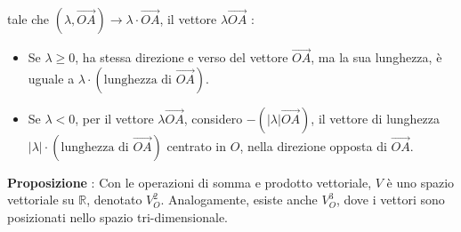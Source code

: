 \documentclass[12pt, letterpaper]{article}
\newcommand{\R}{{\mathbb R}}
\begin{document}
tale che \((\lambda,\vec{OA})\rightarrow \lambda\cdot\vec{OA}\), il vettore \(\lambda\vec{OA}\) : \begin{itemize}
    \item Se \(\lambda\ge 0\), ha stessa direzione e verso del vettore \(\vec{OA}\), ma la sua lunghezza, è uguale 
    a \(\lambda \cdot (\text{lunghezza di }\vec{OA})\).
    \item Se \(\lambda<0\), per il vettore \(\lambda\vec{OA}\), considero \(-(|\lambda|\vec{OA})\), il vettore 
    di lunghezza \(|\lambda| \cdot (\text{lunghezza di }\vec{OA})\) centrato in \(O\), nella direzione 
    opposta di \(\vec{OA}\).
\end{itemize}
\begin{figure}[h]
\end{figure}
\textbf{Proposizione }: Con le operazioni di somma e prodotto vettoriale, \(V\) è uno spazio 
vettoriale su \(\R\), denotato \(V_O^2\). Analogamente, esiste anche \(V_O^3\), dove i vettori sono 
posizionati nello spazio tri-dimensionale.
\end{document}
